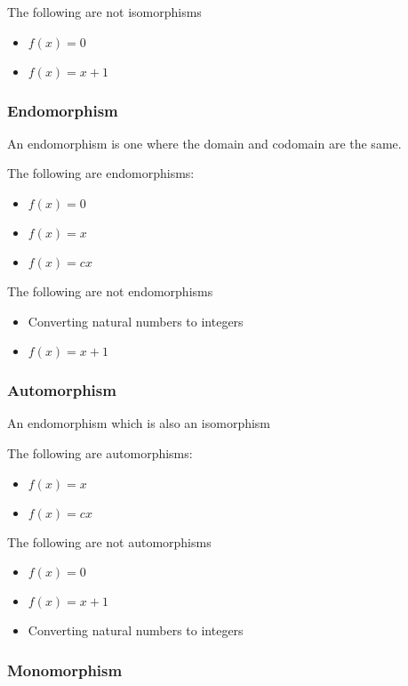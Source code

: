 The following are not isomorphisms

\begin{itemize}
\item \(f(x)=0\)
\item \(f(x)=x+1\)
\end{itemize}

\subsubsection{Endomorphism}

An endomorphism is one where the domain and codomain are the same.

The following are endomorphisms:

\begin{itemize}
\item \(f(x)=0\)
\item \(f(x)=x\)
\item \(f(x)=cx\)
\end{itemize}

The following are not endomorphisms

\begin{itemize}
\item Converting natural numbers to integers
\item \(f(x)=x+1\)
\end{itemize}

\subsubsection{Automorphism}

An endomorphism which is also an isomorphism

The following are automorphisms:
\begin{itemize}
\item \(f(x)=x\)
\item \(f(x)=cx\)
\end{itemize}

The following are not automorphisms

\begin{itemize}
\item \(f(x)=0\)
\item \(f(x)=x+1\)
\item Converting natural numbers to integers
\end{itemize}

\subsubsection{Monomorphism}

